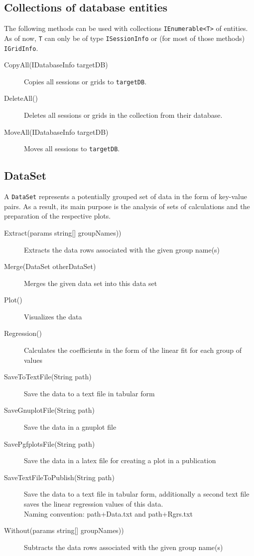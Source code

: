 \subsection{Collections of database entities}
The following methods can be used with collections \lstinline{IEnumerable<T>} of entities. As of now, \lstinline{T} can only be of type \lstinline{ISessionInfo} or (for most of those methods) \lstinline{IGridInfo}.
\begin{description}
	\item[CopyAll(IDatabaseInfo targetDB)]
	Copies all sessions or grids to \lstinline{targetDB}.
	
	\item[DeleteAll()]
	Deletes all sessions or grids in the collection from their database.
	
	\item[MoveAll(IDatabaseInfo targetDB)]
	Moves all sessions to \lstinline{targetDB}.
\end{description}

\subsection{DataSet}
\label{sec:DataSet}

A \lstinline{DataSet} represents a potentially grouped set of data in the form of key-value pairs. As a result, its main purpose is the analysis of sets of calculations and the preparation of the respective plots.
\begin{description}
	\item[Extract(params string{[}{]} groupNames))]
	Extracts the data rows associated with the given group name(s)
	
	\item[Merge(DataSet otherDataSet)]
	Merges the given data set into this data set
	
	\item[Plot()]
	Visualizes the data
	
	\item[Regression()]
	Calculates the coefficients in the form of the linear fit for each group of values
	
	\item[SaveToTextFile(String path)]
	Save the data to a text file in tabular form
	
	\item[SaveGnuplotFile(String path)]
	Save the data in a gnuplot file
	
	\item[SavePgfplotsFile(String path)]
	Save the data in a latex file for creating a plot in a publication
	
	\item[SaveTextFileToPublish(String path)]
	Save the data to a text file in tabular form, additionally a second text file saves the linear regression values of this data.\\ Naming convention: path+Data.txt and path+Rgrs.txt
	
	\item[Without(params string{[}{]} groupNames))]
	Subtracts the data rows associated with the given group name(s)
\end{description}



